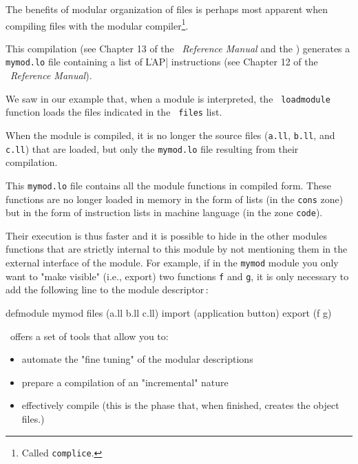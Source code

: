
The benefits of modular organization of files is perhaps most apparent
when compiling files with the modular compiler\footnote{Called {\tt complice}.}.


This compilation (see Chapter 13 of the \LeLisp\ {\em Reference Manual} and the ) generates a {\tt mymod.lo} file containing a list of \|LAP| instructions (see Chapter 12 of the \LeLisp\ {\em Reference Manual}).

We saw in our example that, when a module is interpreted, the {\tt
loadmodule} function loads the files indicated in the {\tt
files} list.

When the module is compiled, it is no longer the source files ({\tt a.ll}, {\tt b.ll}, and {\tt c.ll}) that are loaded, but only the {\tt mymod.lo} file resulting from their compilation.

This {\tt mymod.lo} file contains all the module functions in compiled form.  These functions are no longer loaded in memory in the form of lists (in the {\tt cons} zone) but in the form of instruction lists in machine language (in the zone {\tt code}).

Their execution is thus faster and it is possible to hide in the other modules functions that are strictly internal to this module by not mentioning them in the external interface of the module.
For example, if in the {\tt mymod} module you only want to "make visible" (i.e., export) two functions {\tt f} and {\tt g}, it is only necessary to add the following line to the module descriptor\,:

\begin{Code*}
defmodule mymod
files (a.ll b.ll c.ll)
import (application button)
export (f g)
\end{Code*}


\LeLisp\ offers a set of tools that allow you to:
\begin{itemize}
\item automate the "fine tuning" of the modular descriptions
\item prepare a compilation of an "incremental" nature
\item effectively compile (this is the phase that, when finished, creates the object files.)
\end{itemize}

